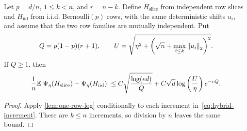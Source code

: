 \begin{proposition}\label{prop:row-replacement}
Let $p=d/n$, $1\le k<n$, and $r=n-k$. Define $H_{\mathrm{slice}}$ from independent row slices and $H_{\mathrm{iid}}$ from i.i.d. Bernoulli$(p)$ rows, with the same deterministic shifts $u_i$, and assume that the two row families are mutually independent. Put
\[
  Q=p(1-p)(r+1),
  \qquad
  U=\sqrt{\eta^2+\left(\sqrt n+\max_{i\le k}\left\|u_i\right\|_2\right)^2}.
\]
If $Q\ge1$, then
\begin{equation}\label{eq:row-replacement}
  \frac1n\mathbb E|\Psi_\eta(H_{\mathrm{slice}})-\Psi_\eta(H_{\mathrm{iid}})|
  \le C\sqrt{\frac{\log(ed)}{Q}}
  +C\sqrt d\log\left(\frac U\eta\right)e^{-cQ}.
\end{equation}
\end{proposition}

\begin{proof}
Apply 
\cref{lem:one-row-log} conditionally to each increment in~\eqref{eq:hybrid-increment}. There are $k\le n$ increments, so division by $n$ leaves the same bound.
\end{proof}

